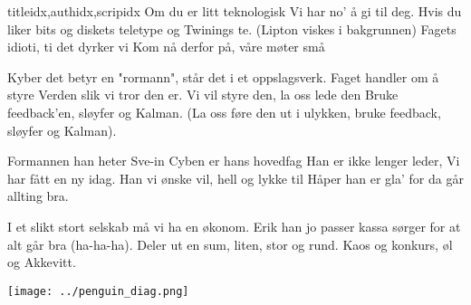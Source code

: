 \documentclass[14pt,letterpaper,norsk]{article}
\begin{document}
\begin{songs}{titleidx,authidx,scripidx}
\beginverse
Om du er litt teknologisk
Vi har no' å gi til deg.
Hvis du liker bits og diskets
teletype og Twinings te.
(Lipton viskes i bakgrunnen)
Fagets idioti, ti det dyrker vi
Kom nå derfor på, våre møter små
\endverse

\beginverse
Kyber det betyr en "rormann",
står det i et oppslagsverk.
Faget handler om å styre
Verden slik vi tror den er.
Vi vil styre den, la oss lede den
Bruke feedback'en, sløyfer og Kalman.
(La oss føre den ut i ulykken,
bruke feedback, sløyfer og Kalman).
\endverse

\beginverse
Formannen han heter Sve-in
Cyben er hans hovedfag
Han er ikke lenger leder,
Vi har fått en ny idag.
Han vi ønske vil, hell og lykke til
Håper han er gla' for da går allting bra.
\endverse

\beginverse
I et slikt stort selskab
må vi ha en økonom.
Erik han jo passer kassa
sørger for at alt går bra (ha-ha-ha).
Deler ut en sum, liten, stor og rund.
Kaos og konkurs, øl og Akkevitt.
\endverse
\endsong

\end{songs}

\newpage

\texttt{[image: ../penguin\_diag.png]}
\end{document}
